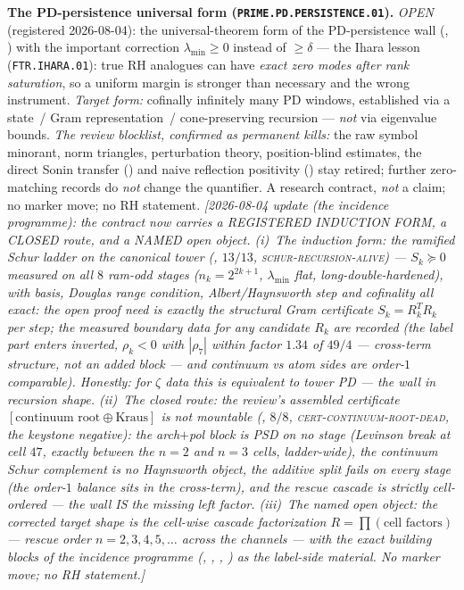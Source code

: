 \par\smallskip\noindent\textbf{The PD-persistence universal form
(\texttt{PRIME.PD.PERSISTENCE.01}).}
\emph{OPEN} (registered 2026-08-04): the universal-theorem form of
the PD-persistence wall (,
) with the important correction
$\lambda_{\min}\ge0$ instead of $\ge\delta$ --- the Ihara lesson
(\texttt{FTR.IHARA.01}): true RH analogues can have \emph{exact zero
modes after rank saturation}, so a uniform margin is stronger than
necessary and the wrong instrument.  \emph{Target form:} cofinally
infinitely many PD windows, established via a state~/ Gram
representation~/ cone-preserving recursion --- \emph{not} via
eigenvalue bounds.  \emph{The review blocklist, confirmed as
permanent kills:} the raw symbol minorant, norm triangles,
perturbation theory, position-blind estimates, the direct Sonin
transfer () and naive
reflection positivity ()
stay retired; further zero-matching records do \emph{not} change the
quantifier.  A research contract, \emph{not} a claim; no marker
move; no RH statement.
\emph{[2026-08-04 update (the incidence programme): the contract now
carries a REGISTERED INDUCTION FORM, a CLOSED route, and a NAMED open
object.  (i)~The induction form: the ramified Schur ladder on the
canonical tower (, $13/13$,
\textsc{schur-recursion-alive}) --- $S_k\succeq0$ measured on all
$8$ ram-odd stages ($n_k=2^{2k+1}$, $\lambda_{\min}$ flat,
long-double-hardened), with basis, Douglas range condition,
Albert/Haynsworth step and cofinality all exact: the open proof need
is \emph{exactly} the structural Gram certificate $S_k=R_k^TR_k$ per
step; the measured boundary data for any candidate $R_k$ are
recorded (the label part enters \emph{inverted}, $\rho_k<0$ with
$|\rho_7|$ within factor $1.34$ of $49/4$ --- cross-term structure,
not an added block --- and continuum vs atom sides are order-$1$
comparable).  Honestly: for $\zeta$ data this is \emph{equivalent}
to tower PD --- the wall in recursion shape.  (ii)~The closed route:
the review's assembled certificate
$[\text{continuum root}\oplus\text{Kraus}]$ is \emph{not mountable}
(, $8/8$,
\textsc{cert-continuum-root-dead}, the keystone negative): the
arch$+$pol block is PSD on \emph{no} stage (Levinson break at cell
$47$, exactly between the $n=2$ and $n=3$ cells, ladder-wide), the
continuum Schur complement is no Haynsworth object, the additive
split fails on every stage (the order-$1$ balance sits in the
cross-term), and the rescue cascade is strictly \emph{cell-ordered}
--- the wall IS the missing left factor.  (iii)~The named open
object: the corrected target shape is the \emph{cell-wise cascade
factorization} $R=\prod(\text{cell factors})$ --- rescue order
$n=2,3,4,5,\dots$ \emph{across} the channels --- with the exact
building blocks of the incidence programme
(,
, ,
) as the label-side
material.  No marker move; no RH statement.]}


